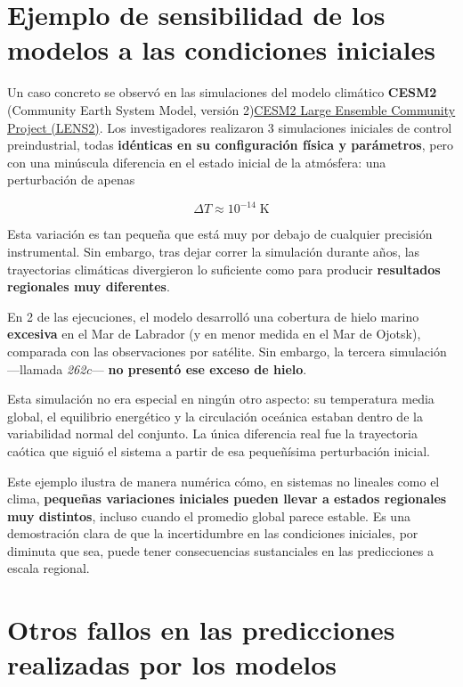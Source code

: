 \documentclass[
  10pt,
  a4paper,
  DIV=11,
  numbers=noendperiod,
  open=any]{scrreprt}
\numberwithin{equation}{chapter}
\numberwithin{equation}{section}
\renewcommand{\[}{\begin{equation}}
\renewcommand{\]}{\end{equation}}
\begin{document}
\section{Ejemplo de sensibilidad de los modelos a las condiciones
iniciales}\label{ejemplo-de-sensibilidad-de-los-modelos-a-las-condiciones-iniciales}

Un caso concreto se observó en las simulaciones del modelo climático
\textbf{CESM2} (Community Earth System Model, versión
2)\href{https://www.cesm.ucar.edu/community-projects/lens2}{CESM2 Large
Ensemble Community Project (LENS2)}. Los investigadores realizaron 3
simulaciones iniciales de control preindustrial, todas \textbf{idénticas
en su configuración física y parámetros}, pero con una minúscula
diferencia en el estado inicial de la atmósfera: una perturbación de
apenas

\begin{equation}
\Delta T \approx 10^{-14} \; \text{K}
\end{equation}

Esta variación es tan pequeña que está muy por debajo de cualquier
precisión instrumental. Sin embargo, tras dejar correr la simulación
durante años, las trayectorias climáticas divergieron lo suficiente como
para producir \textbf{resultados regionales muy diferentes}.

En 2 de las ejecuciones, el modelo desarrolló una cobertura de hielo
marino \textbf{excesiva} en el Mar de Labrador (y en menor medida en el
Mar de Ojotsk), comparada con las observaciones por satélite. Sin
embargo, la tercera simulación ---llamada \emph{262c}--- \textbf{no
presentó ese exceso de hielo}.

Esta simulación no era especial en ningún otro aspecto: su temperatura
media global, el equilibrio energético y la circulación oceánica estaban
dentro de la variabilidad normal del conjunto. La única diferencia real
fue la trayectoria caótica que siguió el sistema a partir de esa
pequeñísima perturbación inicial.

Este ejemplo ilustra de manera numérica cómo, en sistemas no lineales
como el clima, \textbf{pequeñas variaciones iniciales pueden llevar a
estados regionales muy distintos}, incluso cuando el promedio global
parece estable. Es una demostración clara de que la incertidumbre en las
condiciones iniciales, por diminuta que sea, puede tener consecuencias
sustanciales en las predicciones a escala regional.

\section{Otros fallos en las predicciones realizadas por los
modelos}\label{otros-fallos-en-las-predicciones-realizadas-por-los-modelos}
\end{document}
